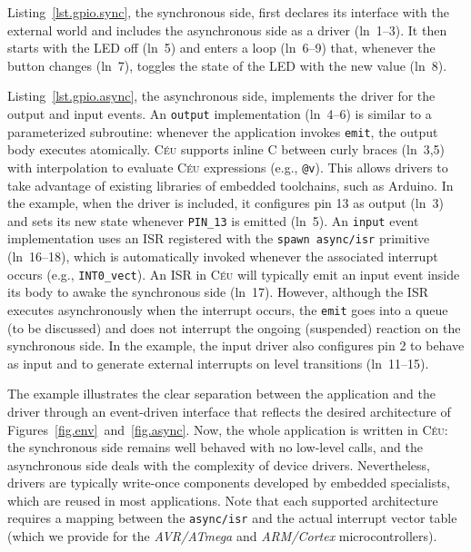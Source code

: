 \documentclass[sigplan,10pt,review,anonymous]{acmart}\settopmatter{printfolios=true,printccs=false,printacmref=false}
\newcommand{\CEU}{\textsc{C\'{e}u}\xspace}
\newcommand{\code}[1] {{\small{\texttt{#1}}}}
\begin{document}
Listing~\ref{lst.gpio.sync}, the synchronous side, first declares its interface
with the external world and includes the asynchronous side as a driver
(ln~1--3).
It then starts with the LED off (ln~5) and enters a loop (ln~6--9) that,
whenever the button changes (ln~7), toggles the state of the LED with the new
value (ln~8).

Listing~\ref{lst.gpio.async}, the asynchronous side, implements the driver for
the output and input events.
%
An \code{output} implementation (ln~4--6) is similar to a parameterized
subroutine: whenever the application invokes \code{emit}, the output body
executes atomically.
\CEU supports inline C between curly braces (ln~3,5) with interpolation to
evaluate \CEU expressions (e.g., \code{@v}).
This allows drivers to take advantage of existing libraries of embedded
toolchains, such as Arduino.
%
In the example, when the driver is included, it configures pin 13 as output
(ln~3) and sets its new state whenever \code{PIN\_13} is emitted (ln~5).
%
An \code{input} event implementation uses an ISR registered with the
\code{spawn async/isr} primitive (ln~16--18), which is automatically invoked
whenever the associated interrupt occurs (e.g., \code{INT0\_vect}).
%
An ISR in \CEU will typically emit an input event inside its body to awake the
synchronous side (ln~17).
However, although the ISR executes asynchronously when the interrupt occurs,
the \code{emit} goes into a queue (to be discussed) and does not interrupt the
ongoing (suspended) reaction on the synchronous side.
%
In the example, the input driver also configures pin 2 to behave as input and
to generate external interrupts on level transitions (ln~11--15).

The example illustrates the clear separation between the application and the
driver through an event-driven interface that reflects the desired architecture
of Figures~\ref{fig.env}~and~\ref{fig.async}.
%
Now, the whole application is written in \CEU:
    the synchronous side remains well behaved with no low-level calls, and
    the asynchronous side deals with the complexity of device drivers.
%
Nevertheless, drivers are typically write-once components developed by embedded
specialists, which are reused in most applications.
%
Note that each supported architecture requires a mapping between the
\code{async/isr} and the actual interrupt vector table (which we provide
for the \emph{AVR/ATmega} and \emph{ARM/Cortex} microcontrollers).
\end{document}
